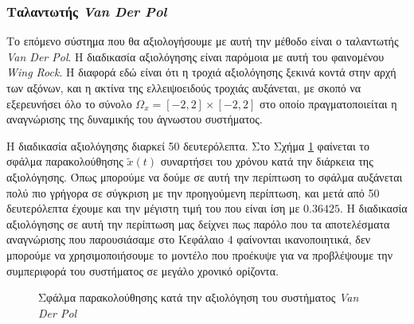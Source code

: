 \subsubsection{Ταλαντωτής \textit{Van Der Pol}}
Το επόμενο σύστημα που θα αξιολογήσουμε με αυτή την μέθοδο είναι ο ταλαντωτής \textit{Van Der Pol}. Η διαδικασία αξιολόγησης είναι παρόμοια με αυτή του φαινομένου \textit{Wing Rock}. Η διαφορά εδώ είναι ότι η τροχιά αξιολόγησης ξεκινά κοντά στην αρχή των αξόνων, και η ακτίνα της ελλειψοειδούς τροχιάς αυξάνεται, με σκοπό να εξερευνήσει όλο το σύνολο $\Omega_x = [-2,2] \times [-2,2] $ στο οποίο πραγματοποιείται η αναγνώρισης της δυναμικής του άγνωστου συστήματος.

Η διαδικασία αξιολόγησης διαρκεί 50 δευτερόλεπτα. Στο Σχήμα \ref{fig:vdp_eval_error} φαίνεται το σφάλμα παρακολούθησης $\tilde{x}(t)$ συναρτήσει του χρόνου κατά την διάρκεια της αξιολόγησης. Όπως μπορούμε να δούμε σε αυτή την περίπτωση το σφάλμα αυξάνεται πολύ πιο γρήγορα σε σύγκριση με την προηγούμενη περίπτωση, και μετά από 50 δευτερόλεπτα έχουμε και την μέγιστη τιμή του που είναι ίση με $0.36425$. Η διαδικασία αξιολόγησης σε αυτή την περίπτωση μας δείχνει πως παρόλο που τα αποτελέσματα αναγνώρισης που παρουσιάσαμε στο Κεφάλαιο $4$ φαίνονται ικανοποιητικά, δεν μπορούμε να χρησιμοποιήσουμε το μοντέλο που προέκυψε για να προβλέψουμε την συμπεριφορά του συστήματος σε μεγάλο χρονικό ορίζοντα.

\begin{figure}
	\centering
	
	\caption{Σφάλμα παρακολούθησης κατά την αξιολόγηση του συστήματος \textit{Van Der Pol} }
	\label{fig:vdp_eval_error}
\end{figure}

